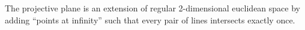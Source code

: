 \begin{definition}
	The projective plane is an extension of regular 2-dimensional euclidean space by adding ``points at infinity'' such that every pair of lines intersects exactly once.
\end{definition}
